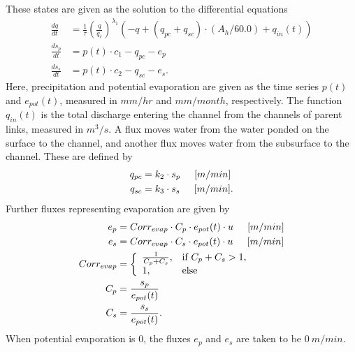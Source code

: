 \documentclass[12pt]{article}
\begin{document}
These states are given as the solution to the differential equations
\begin{align*}
 \frac{dq}{dt} &= \frac{1}{\tau} \left(\frac{q}{q_r}\right)^{\lambda_1} \left( -q + (q_{pc} + q_{sc}) \cdot (A_h/60.0) + q_{in}(t) \right) \\
 \frac{ds_p}{dt} &= p(t) \cdot c_1 - q_{pc} - e_p \\
 \frac{ds_s}{dt} &= p(t) \cdot c_2 - q_{sc} - e_s.
\end{align*}
Here, precipitation and potential evaporation are given as the time series $p(t)$ and $e_{pot}(t)$, measured in $mm/hr$ and $mm/month$, respectively. The function $q_{in}(t)$ is the total discharge entering the channel from the channels of parent links, measured in $m^3/s$. A flux moves water from the water ponded on the surface to the channel, and another flux moves water from the subsurface to the channel. These are defined by
\begin{align*}
 q_{pc} &= k_2 \cdot s_p \hspace{.2in} [m/min] \\
 q_{sc} &= k_3 \cdot s_s \hspace{.2in} [m/min].
\end{align*}
Further fluxes representing evaporation are given by
\begin{align*}
 e_p &= Corr_{evap} \cdot C_p \cdot e_{pot}(t) \cdot u \hspace{.2in} [m/min] \\
 e_s &= Corr_{evap} \cdot C_s \cdot e_{pot}(t) \cdot u \hspace{.2in} [m/min] \\
 Corr_{evap} &= \left\{ \begin{array}{ll} \frac{1}{C_p + C_s}, & \mbox{if } C_p + C_s > 1, \\ 1, & \mbox{else}  \end{array} \right. \\
 C_p &= \frac{s_p}{e_{pot}(t)} \\
 C_s &= \frac{s_s}{e_{pot}(t)}.
\end{align*}
When potential evaporation is $0$, the fluxes $e_p$ and $e_s$ are taken to be $0\ m/min$.
\end{document}
